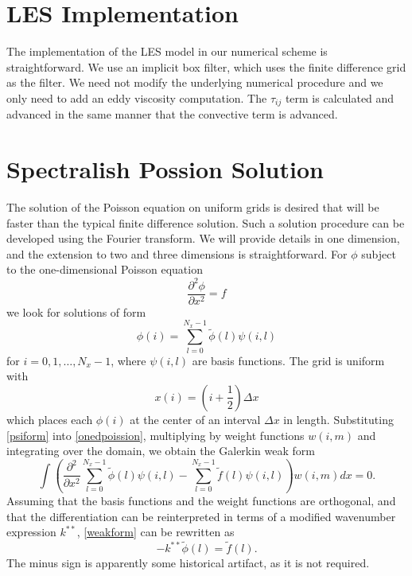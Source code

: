 \documentclass[10pt]{article}
\begin{document}
\section{LES Implementation}
%
The implementation of the LES model in our numerical scheme is
straightforward.  We use an implicit box filter, which uses the finite
difference grid as the filter.  We need not modify the underlying
numerical procedure and we only need to add an eddy viscosity
computation.  The $\tau_{ij}$ term is calculated and advanced in the
same manner that the convective term is advanced.

\section{Spectralish Possion Solution}

The solution of the Poisson equation on uniform grids is desired that
will be faster than the typical finite difference solution.  Such a
solution procedure can be developed using the Fourier transform.  We
will provide details in one dimension, and the extension to two and
three dimensions is straightforward.  For $\phi$ subject to the
one-dimensional Poisson equation
\begin{equation}\label{onedpoission}
\frac{\partial^2\phi}{\partial x^2} = f
\end{equation}
we look for solutions of form 
\begin{equation}\label{psiform}
\phi(i)=\sum^{N_x-1}_{l=0} \tilde{\phi}(l)\psi(i,l)
\end{equation}
for $i=0,1,\ldots,N_x-1$, where $\psi(i,l)$ are basis functions.  The
grid is uniform with
\begin{equation}
x(i)=\left(i+\frac{1}{2}\right)\Delta x
\end{equation}
which places each $\phi(i)$ at the center of an interval $\Delta x$ in
length.  Substituting \autoref{psiform} into \autoref{onedpoission},
multiplying by weight functions $w(i,m)$ and integrating over the
domain, we obtain the Galerkin weak form
\begin{equation}\label{weakform}
\int \left(\frac{\partial^2}{\partial x^2}\sum^{N_x-1}_{l=0} \tilde{\phi}(l)\psi(i,l) - 
           \sum^{N_x-1}_{l=0} \tilde{f}(l)\psi(i,l)\right)w(i,m)dx=0.
\end{equation}
Assuming that the basis functions and the weight functions are
orthogonal, and that the differentiation can be reinterpreted in terms
of a modified wavenumber expression $k^{**}$, \autoref{weakform} can
be rewritten as
\begin{equation}
-k^{**} \tilde{\phi}(l) = \tilde{f}(l).
\end{equation}
The minus sign is apparently some historical artifact, as it is not required.
\end{document}
